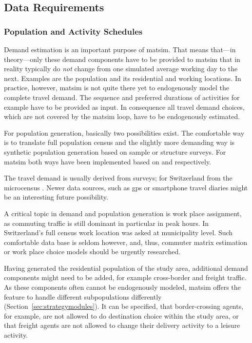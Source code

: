 \subsection{Data Requirements}
\subsubsection{Population and Activity Schedules}
Demand estimation is 
an important purpose of \gls{matsim}. That means that---in theory---only these demand components have to be provided to \gls{matsim} that in reality typically do \emph{not} change
from one simulated average working day to the next. Examples are the population and its residential and working locations. In practice, however, \gls{matsim} is not quite there yet to endogenously model the complete travel demand. The sequence and preferred durations of activities for example have to be provided as input. In consequence all travel demand choices, which are not covered by the \gls{matsim} loop, have to be endogenously estimated. 

For population generation, basically two possibilities exist. The comfortable way is to translate full population census and the slightly more demanding way is synthetic population generation \citep[e.g.,][]{GuoBhat_TRR_2007} based on sample or structure surveys. For \gls{matsim} both ways have been implemented based on \citet[][]{BfS_VZ_2000} and \citet[][]{Mueller_unpub_STRC_2011} respectively.

The travel demand is usually derived from surveys; for Switzerland from the \gls{microcensus} \citep[][]{BfS-MZ2005_manual_2006}. Newer data sources, such as \gls{gps} or smartphone travel diaries might be an interesting future possibility.

A critical topic in demand and population generation is work place assignment, as commuting traffic is still dominant in particular in peak hours. In Switzerland's full census work location was asked at municipality level. Such comfortable data base is seldom however, and, thus, commuter matrix estimation or work place choice models should be urgently researched.

Having generated the residential population of the study area, additional demand components might need to be added, for example cross-border and freight traffic. As these components often cannot be endogenously modeled, \gls{matsim} offers the feature to handle different subpopulations differently (Section~\ref{sec:strategymodules}). It can be specified, that border-crossing agents, for example, are not allowed to do destination choice within the study area, or that freight agents are not allowed to change their delivery activity to a leisure activity.

